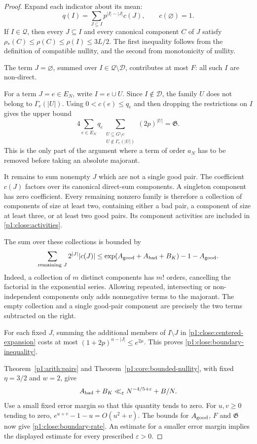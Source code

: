 \begin{proof}
Expand each indicator about its mean:
\begin{equation}
 q(I)=\sum_{J\subseteq I}p^{|I|-|J|}c(J),
 \qquad c(\varnothing)=1.
 \label{p1:close:centered-expansion}
\end{equation}
If $I\in\mathscr Q$, then every $J\subseteq I$ and every
canonical component $C$ of $J$ satisfy
$\rho_*(C)\le\rho(C)\le\rho(I)\le3L/2$.
The first inequality follows from the definition of compatible
nullity, and the second from monotonicity of nullity.

The term $J=\varnothing$, summed over
$I\in\mathscr Q\setminus\mathscr D$, contributes at most $F$:
all such $I$ are non-direct.

For a term $J=e\in E_N$, write $I=e\cup U$.
Since $I\notin\mathscr D$, the family $U$ does not belong to
$\Gamma_e(|U|)$.  Using $0<c(e)\le q_e$ and then dropping
the restrictions on $I$ gives the upper bound
\[
 4\sum_{e\in E_N}q_e
      \sum_{\substack{U\subseteq G\setminus e\\
                          U\notin\Gamma_e(|U|)}}(2p)^{|U|}
       =\mathfrak G.
\]
This is the only part of the argument where a term of order
$a_N$ has to be removed before taking an absolute majorant.

It remains to sum nonempty $J$ which are not a single good pair.
The coefficient $c(J)$ factors over its canonical direct-sum
components.  A singleton component has zero coefficient.
Every remaining nonzero family is therefore a collection of
components of size at least two, containing either a bad pair,
a component of size at least three, or at least two good pairs.
Its component activities are included in
\eqref{p1:close:activities}.

The sum over these collections is bounded by
\begin{equation}
 \sum_{\text{remaining }J}2^{|J|}|c(J)|
 \le \exp(A_{\rm good}+A_{\rm bad}+B_K)-1-A_{\rm good}.
 \label{p1:close:component-exponential}
\end{equation}
Indeed, a collection of $m$ distinct components has $m!$
orders, cancelling the factorial in the exponential series.
Allowing repeated, intersecting or non-independent components
only adds nonnegative terms to the majorant.  The empty
collection and a single good-pair component are precisely
the two terms subtracted on the right.

For each fixed $J$, summing the additional members of
$I\setminus J$ in \eqref{p1:close:centered-expansion}
costs at most
$(1+2p)^{n-|J|}\le e^{2\mu}$.  This proves
\eqref{p1:close:boundary-inequality}.

Theorem~\ref{p1:arith:pairs} and
Theorem~\ref{p1:core:bounded-nullity}, with fixed
$\eta=3/2$ and $w=2$, give
\[
 A_{\rm bad}+B_K
      \ll_\varepsilon N^{-4/5+\varepsilon}+B/N.
\]
Use a small fixed error margin so that this quantity tends to
zero.  For $u,v\ge0$ tending to zero,
$e^{u+v}-1-u=O(u^2+v)$.
The bounds for $A_{\rm good}$, $F$ and $\mathfrak G$
now give \eqref{p1:close:boundary-rate}.
An estimate for a smaller error margin implies the displayed
estimate for every prescribed $\varepsilon>0$.
\end{proof}

